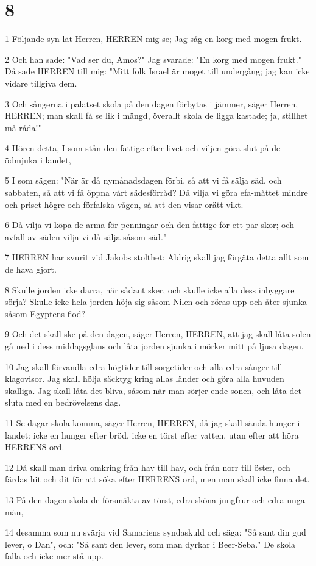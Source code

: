 \chapter{8}

\par 1 Följande syn lät Herren, HERREN mig se; Jag såg en korg med mogen frukt.
\par 2 Och han sade: "Vad ser du, Amos?" Jag svarade: "En korg med mogen frukt." Då sade HERREN till mig: "Mitt folk Israel är moget till undergång; jag kan icke vidare tillgiva dem.
\par 3 Och sångerna i palatset skola på den dagen förbytas i jämmer, säger Herren, HERREN; man skall få se lik i mängd, överallt skola de ligga kastade; ja, stillhet må råda!"
\par 4 Hören detta, I som stån den fattige efter livet och viljen göra slut på de ödmjuka i landet,
\par 5 I som sägen: "När är då nymånadsdagen förbi, så att vi få sälja säd, och sabbaten, så att vi få öppna vårt sädesförråd? Då vilja vi göra efa-måttet mindre och priset högre och förfalska vågen, så att den visar orätt vikt.
\par 6 Då vilja vi köpa de arma för penningar och den fattige för ett par skor; och avfall av säden vilja vi då sälja såsom säd."
\par 7 HERREN har svurit vid Jakobs stolthet: Aldrig skall jag förgäta detta allt som de hava gjort.
\par 8 Skulle jorden icke darra, när sådant sker, och skulle icke alla dess inbyggare sörja? Skulle icke hela jorden höja sig såsom Nilen och röras upp och åter sjunka såsom Egyptens flod?
\par 9 Och det skall ske på den dagen, säger Herren, HERREN, att jag skall låta solen gå ned i dess middagsglans och låta jorden sjunka i mörker mitt på ljusa dagen.
\par 10 Jag skall förvandla edra högtider till sorgetider och alla edra sånger till klagovisor. Jag skall hölja säcktyg kring allas länder och göra alla huvuden skalliga. Jag skall låta det bliva, såsom när man sörjer ende sonen, och låta det sluta med en bedrövelsens dag.
\par 11 Se dagar skola komma, säger Herren, HERREN, då jag skall sända hunger i landet: icke en hunger efter bröd, icke en törst efter vatten, utan efter att höra HERRENS ord.
\par 12 Då skall man driva omkring från hav till hav, och från norr till öster, och färdas hit och dit för att söka efter HERRENS ord, men man skall icke finna det.
\par 13 På den dagen skola de försmäkta av törst, edra sköna jungfrur och edra unga män,
\par 14 desamma som nu svärja vid Samariens syndaskuld och säga: "Så sant din gud lever, o Dan", och: "Så sant den lever, som man dyrkar i Beer-Seba." De skola falla och icke mer stå upp.

